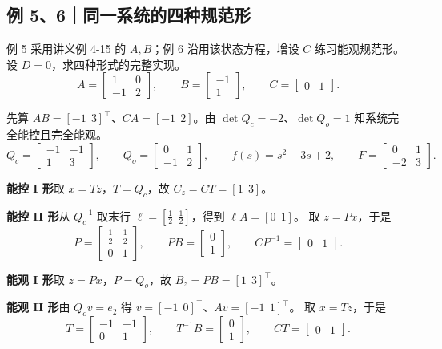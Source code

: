 \documentclass[UTF8,a4paper,12pt,fontset=fandol]{ctexart}
\begin{document}
\newpage
\subsection*{例 5、6｜同一系统的四种规范形}

例 5 采用讲义例 4-15 的 $A,B$；例 6 沿用该状态方程，增设 $C$ 练习能观规范形。设 $D=0$，求四种形式的完整实现。
\[
  A=\begin{bmatrix}1&0\\-1&2\end{bmatrix},\qquad
  B=\begin{bmatrix}-1\\1\end{bmatrix},\qquad C=\begin{bmatrix}0&1\end{bmatrix}.
\]

先算 $AB=[-1\ \ 3]^\top$、$CA=[-1\ \ 2]$。由 $\det Q_c=-2$、$\det Q_o=1$ 知系统完全能控且完全能观。
\[
  Q_c=\begin{bmatrix}-1&-1\\1&3\end{bmatrix},\qquad
  Q_o=\begin{bmatrix}0&1\\-1&2\end{bmatrix},\qquad
  f(s)=s^2-3s+2,\qquad F=\begin{bmatrix}0&1\\-2&3\end{bmatrix}.
\]

\textbf{能控 I 形}\quad 取 $x=Tz$，$T=Q_c$，故 $C_z=CT=[1\ \ 3]$。

\textbf{能控 II 形}\quad 从 $Q_c^{-1}$ 取末行 $\ell=[\tfrac12\ \ \tfrac12]$，得到 $\ell A=[0\ \ 1]$。
取 $z=Px$，于是
\[
  P=\begin{bmatrix}\tfrac12&\tfrac12\\0&1\end{bmatrix},\qquad
  PB=\begin{bmatrix}0\\1\end{bmatrix},\qquad CP^{-1}=\begin{bmatrix}0&1\end{bmatrix}.
\]

\textbf{能观 I 形}\quad 取 $z=Px$，$P=Q_o$，故 $B_z=PB=[1\ \ 3]^\top$。

\textbf{能观 II 形}\quad 由 $Q_ov=e_2$ 得 $v=[-1\ \ 0]^\top$、$Av=[-1\ \ 1]^\top$。
取 $x=Tz$，于是
\[
  T=\begin{bmatrix}-1&-1\\0&1\end{bmatrix},\qquad
  T^{-1}B=\begin{bmatrix}0\\1\end{bmatrix},\qquad CT=\begin{bmatrix}0&1\end{bmatrix}.
\]
\end{document}
